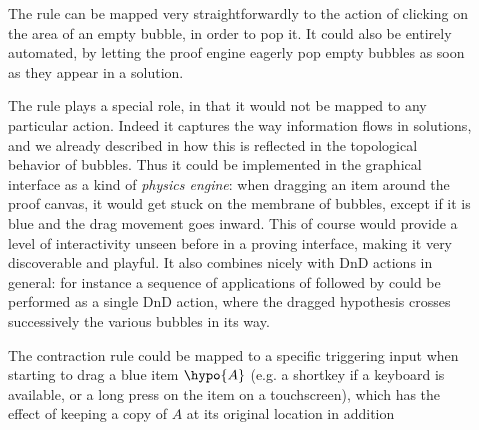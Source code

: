 \begin{description}
  \item[\textbf{\popping}]
    The {} rule can be mapped very straightforwardly to the action of
    clicking on the area of an empty bubble, in order to pop it. It could also
    be entirely automated, by letting the proof engine eagerly pop empty bubbles
    as soon as they appear in a solution.
  \item[\textbf{\flow}]
    The {} rule plays a special role, in that it would not be mapped
    to any particular action. Indeed it captures the way information flows in
    solutions, and we already described in  how this is
    reflected in the topological behavior of bubbles. Thus it could be
    implemented in the graphical interface as a kind of \emph{physics engine}:
    when dragging an item around the proof canvas, it would get stuck on the
    membrane of bubbles, except if it is blue and the drag movement goes inward.
    This of course would provide a level of interactivity unseen before in a
    proving interface, making it very discoverable and playful. It also combines
    nicely with DnD actions in general: for instance a sequence of applications
    of {} followed by {} could be performed as
    a single DnD action, where the dragged hypothesis crosses successively the
    various bubbles in its way.
  \item[\textbf{\resource}]
    The contraction rule {} could be mapped to a specific triggering
    input when starting to drag a blue item $\hypo{A}$ (e.g. a shortkey if a
    keyboard is available, or a long press on the item on a touchscreen), which
    has the effect of keeping a copy of $A$ at its original location in addition

\end{description}
